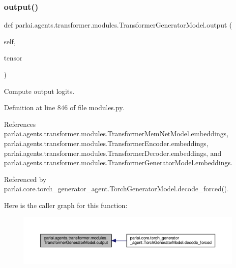 \subsubsection{\texorpdfstring{output()}{output()}}
{\footnotesize\ttfamily def parlai.\+agents.\+transformer.\+modules.\+Transformer\+Generator\+Model.\+output (\begin{DoxyParamCaption}\item[{}]{self,  }\item[{}]{tensor }\end{DoxyParamCaption})}

\begin{DoxyVerb}Compute output logits.\end{DoxyVerb}
 

Definition at line 846 of file modules.\+py.



References parlai.\+agents.\+transformer.\+modules.\+Transformer\+Mem\+Net\+Model.\+embeddings, parlai.\+agents.\+transformer.\+modules.\+Transformer\+Encoder.\+embeddings, parlai.\+agents.\+transformer.\+modules.\+Transformer\+Decoder.\+embeddings, and parlai.\+agents.\+transformer.\+modules.\+Transformer\+Generator\+Model.\+embeddings.



Referenced by parlai.\+core.\+torch\+\_\+generator\+\_\+agent.\+Torch\+Generator\+Model.\+decode\+\_\+forced().

Here is the caller graph for this function\+:
\nopagebreak
\begin{figure}[H]
\begin{center}
\leavevmode
\includegraphics[width=350pt]{classparlai_1_1agents_1_1transformer_1_1modules_1_1TransformerGeneratorModel_ae0f0d3d038cc12075501aae3a059c997_icgraph}
\end{center}
\end{figure}
\mbox{\label{classparlai_1_1agents_1_1transformer_1_1modules_1_1TransformerGeneratorModel_a7ee3a87dd94d18353bca09990e8d5821}} 
